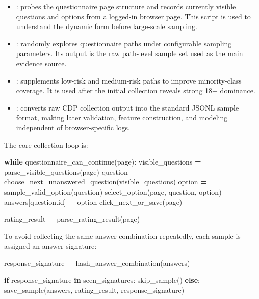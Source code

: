 \documentclass[UTF8,a4paper,12pt]{ctexart}
\newenvironment{Shaded}{\begin{snugshade}}{\end{snugshade}}
\newcommand{\BuiltInTok}[1]{#1}
\newcommand{\ControlFlowTok}[1]{\textcolor[rgb]{0.13,0.29,0.53}{\textbf{#1}}}
\newcommand{\KeywordTok}[1]{\textcolor[rgb]{0.13,0.29,0.53}{\textbf{#1}}}
\newcommand{\NormalTok}[1]{#1}
\newcommand{\OperatorTok}[1]{\textcolor[rgb]{0.81,0.36,0.00}{\textbf{#1}}}
\renewenvironment{Shaded}{%
    \vspace{0.35em}%
    \begin{tcolorbox}[enhanced,breakable,colback=zjucodebg,colframe=zjucodeframe,boxrule=0.45pt,leftrule=2.2pt,arc=1.6mm,left=1.8mm,right=1.8mm,top=1.2mm,bottom=1.2mm]%
  }{%
    \end{tcolorbox}%
    \vspace{0.25em}%
  }%
\providecommand{\tightlist}{%
  \setlength{\itemsep}{0pt}\setlength{\parskip}{0pt}}
\begin{document}
\begin{itemize}
\tightlist
\item
  : probes the questionnaire page structure and records currently visible questions and options from a logged-in browser page. This script is used to understand the dynamic form before large-scale sampling.
\item
  : randomly explores questionnaire paths under configurable sampling parameters. Its output is the raw path-level sample set used as the main evidence source.
\item
  : supplements low-risk and medium-risk paths to improve minority-class coverage. It is used after the initial collection reveals strong 18+ dominance.
\item
  : converts raw CDP collection output into the standard JSONL sample format, making later validation, feature construction, and modeling independent of browser-specific logs.
\end{itemize}

The core collection loop is:

\begin{Shaded}
\begin{Highlighting}[]
\ControlFlowTok{while}\NormalTok{ questionnaire\_can\_continue(page):}
\NormalTok{    visible\_questions }\OperatorTok{=}\NormalTok{ parse\_visible\_questions(page)}
\NormalTok{    question }\OperatorTok{=}\NormalTok{ choose\_next\_unanswered\_question(visible\_questions)}
\NormalTok{    option }\OperatorTok{=}\NormalTok{ sample\_valid\_option(question)}
\NormalTok{    select\_option(page, question, option)}
\NormalTok{    answers[question.}\BuiltInTok{id}\NormalTok{] }\OperatorTok{=}\NormalTok{ option}
\NormalTok{    click\_next\_or\_save(page)}

\NormalTok{rating\_result }\OperatorTok{=}\NormalTok{ parse\_rating\_result(page)}
\end{Highlighting}
\end{Shaded}

To avoid collecting the same answer combination repeatedly, each sample is assigned an answer signature:

\begin{Shaded}
\begin{Highlighting}[]
\NormalTok{response\_signature }\OperatorTok{=}\NormalTok{ hash\_answer\_combination(answers)}

\ControlFlowTok{if}\NormalTok{ response\_signature }\KeywordTok{in}\NormalTok{ seen\_signatures:}
\NormalTok{    skip\_sample()}
\ControlFlowTok{else}\NormalTok{:}
\NormalTok{    save\_sample(answers, rating\_result, response\_signature)}
\end{Highlighting}
\end{Shaded}
\end{document}
